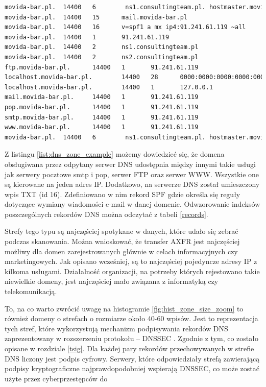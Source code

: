 \begin{lstlisting}[label={list:dns_zone_example},captionpos=b,caption=Przykładowa odpowiedź na żądanie strefy DNS.,language=bash]
movida-bar.pl.  14400   6        ns1.consultingteam.pl. hostmaster.movida-bar.pl. 1952801133 3222735464 1869837421 1634956389 1925188727
movida-bar.pl.  14400   15      mail.movida-bar.pl
movida-bar.pl.  14400   16      v=spf1 a mx ip4:91.241.61.119 ~all
movida-bar.pl.  14400   1       91.241.61.119
movida-bar.pl.  14400   2       ns1.consultingteam.pl
movida-bar.pl.  14400   2       ns2.consultingteam.pl
ftp.movida-bar.pl.      14400   1       91.241.61.119
localhost.movida-bar.pl.        14400   28      0000:0000:0000:0000:0000:0000:0000:0001
localhost.movida-bar.pl.        14400   1       127.0.0.1
mail.movida-bar.pl.     14400   1       91.241.61.119
pop.movida-bar.pl.      14400   1       91.241.61.119
smtp.movida-bar.pl.     14400   1       91.241.61.119
www.movida-bar.pl.      14400   1       91.241.61.119
movida-bar.pl.  14400   6        ns1.consultingteam.pl. hostmaster.movida-bar.pl. 2013010900 14400 3600 1209600 86400
\end{lstlisting}

Z listingu \ref{list:dns_zone_example} możemy dowiedzieć się, że domena obsługiwana przez odpytany serwer DNS udostępnia między
innymi takie usługi jak serwery pocztowe smtp i pop, serwer FTP oraz serwer WWW. Wszystkie one są kierowane na jeden adres IP.
Dodatkowo, na serwerze DNS został umieszczony wpis TXT (id 16). Zdefiniowano w nim rekord SPF gdzie określa się reguły dotyczące
wymiany wiadomości e-mail w danej domenie. Odwzorowanie indeksów poszczególnych rekordów DNS można odczytać z tabeli \ref{records}.

Strefy tego typu są najczęściej spotykane w danych, które udało się zebrać podczas skanowania. Można wnioskować, że transfer AXFR
jest najczęściej możliwy dla domen zarejestrowanych głównie w celach informacyjnych czy marketingowych. Jak opisano wcześniej, są
to najczęściej pojedyncze adresy IP z kilkoma usługami. Działalność organizacji, na potrzeby których rejestowano takie niewielkie
domeny, jest najczęściej mało związana z informatyką czy telekomunikacją.

To, na co warto zwrócić uwagę na histogramie \ref{fig:hist_zone_size_zoom} to również domeny o strefach o rozmiarze około 40-60 wpisów.
Jest to reprezentacja tych stref, które wykorzystują mechanizm podpisywania rekordów DNS zaprezentowany w rozszerzeniu
protokołu -- DNSSEC \cite{RFC4034, RFC4035}. Zgodnie z tym, co zostało opisane w rozdziale \ref{tsig}. Dla każdej pary rekordów
przechowywanych w strefie DNS liczony jest podpis cyfrowy. Serwery, które odpowiedziały strefą zawierającą podpisy kryptograficzne
najprawdopodobniej wspierają DNSSEC, co może zostać użyte przez cyberprzestępców do

